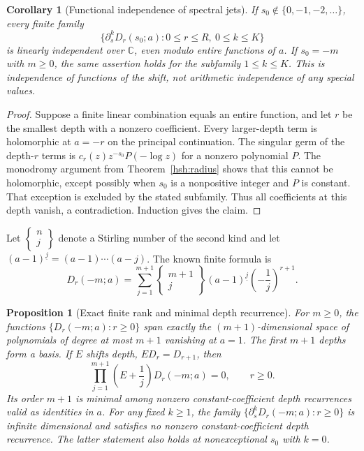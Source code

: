 \documentclass[11pt,a4paper]{article}
\numberwithin{equation}{section}
\newtheorem{proposition}[theorem]{Proposition}
\newtheorem{corollary}[theorem]{Corollary}
\theoremstyle{definition}
\theoremstyle{remark}
\begin{document}
\begin{corollary}[Functional independence of spectral jets]
\label{hsh:independence}
If $s_0\notin\{0,-1,-2,\ldots\}$, every finite family
\[
 \{\partial_s^kD_r(s_0;a):0\leq r\leq R,\ 0\leq k\leq K\}
\]
is linearly independent over $\mathbb C$, even modulo entire
functions of $a$.  If $s_0=-m$ with $m\geq0$, the same assertion
holds for the subfamily $1\leq k\leq K$.
This is independence of functions of the shift, not arithmetic
independence of any special values.
\end{corollary}

\begin{proof}
Suppose a finite linear combination equals an entire function,
and let $r$ be the smallest depth with a nonzero coefficient.
Every larger-depth term is holomorphic at $a=-r$ on the principal
continuation.  The singular germ of the depth-$r$ terms is
$c_r(z)z^{-s_0}P(-\log z)$ for a nonzero polynomial $P$.
The monodromy argument from Theorem~\ref{hsh:radius} shows that
this cannot be holomorphic, except possibly when $s_0$ is a
nonpositive integer and $P$ is constant.  That exception is
excluded by the stated subfamily.  Thus all coefficients at
this depth vanish, a contradiction.  Induction gives the claim.
\end{proof}

Let $\left\{\begin{smallmatrix}n\\j\end{smallmatrix}\right\}$
denote a Stirling number of the second kind and let
$(a-1)^{\underline j}=(a-1)\cdots(a-j)$.
The known finite formula \cite{RepoExact,RepoMixed} is
\begin{equation}\label{hsh:finiteStirling}
 D_r(-m;a)=\sum_{j=1}^{m+1}
 \left\{\begin{matrix}m+1\\j\end{matrix}\right\}
           (a-1)^{\underline j}\left(-\frac1j\right)^{r+1}.
\end{equation}

\begin{proposition}[Exact finite rank and minimal depth recurrence]
\label{hsh:rank}
For $m\geq0$, the functions $\{D_r(-m;a):r\geq0\}$ span
exactly the $(m+1)$-dimensional space of polynomials of degree
at most $m+1$ vanishing at $a=1$.  The first $m+1$ depths form
a basis.  If $E$ shifts depth, $ED_r=D_{r+1}$, then
\begin{equation}\label{hsh:recurrence}
 \boxed{\displaystyle
       \prod_{j=1}^{m+1}\left(E+\frac1j\right)D_r(-m;a)=0,
       \qquad r\geq0.}
\end{equation}
Its order $m+1$ is minimal among nonzero constant-coefficient
depth recurrences valid as identities in $a$.
For any fixed $k\geq1$, the family
$\{\partial_s^kD_r(-m;a):r\geq0\}$ is infinite dimensional and
satisfies no nonzero constant-coefficient depth recurrence.
The latter statement also holds at nonexceptional $s_0$ with $k=0$.
\end{proposition}
\end{document}
